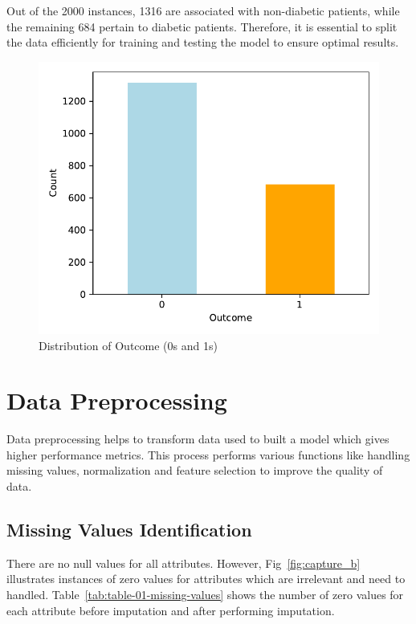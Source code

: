 Out of the 2000 instances, 1316 are associated with non-diabetic patients, while the remaining 684 pertain to diabetic patients. Therefore, it is essential to split the data efficiently for training and testing the model to ensure optimal results.
\begin{figure}[ht]
    \centering    \includegraphics[scale=0.8]{figures/data_distribution.pdf}
    \caption{Distribution of Outcome (0s and 1s)}
    \label{fig:capture_e}
\end{figure}


\section{Data Preprocessing}

Data preprocessing helps to transform data used to built a model which gives higher performance metrics. This process performs various functions like handling missing values, normalization and feature selection to improve the quality of data.

\subsection{Missing Values Identification}
There are no null values for all attributes. However, Fig~\ref{fig:capture_b} illustrates instances of zero values for attributes which are irrelevant and need to handled. Table~\ref{tab:table-01-missing-values} shows the number of zero values for each attribute before imputation and after performing imputation.

